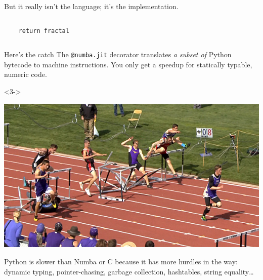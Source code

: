 \documentclass[aspectratio=169]{beamer}
\begin{document}
\begin{frame}[fragile]{But it really isn't the language; it's the implementation.}
\begin{columns}
\begin{onlyenv}
\begin{verbatim}
    return fractal
\end{verbatim}
\end{onlyenv}
\end{columns}

\large
\vspace{0.25 cm}
\begin{center}
\end{center}
\end{frame}

\begin{frame}{Here's the catch}
\large
\vspace{0.5 cm}
The \texttt{@numba.jit} decorator translates {\it a subset of} Python bytecode to machine instructions. You only get a speedup for statically typable, numeric code.

\begin{center}
\Large {}
\end{center}

\begin{uncoverenv}<3->
\begin{center}
\includegraphics[width=0.4\linewidth]{hurdle9.jpg}
\end{center}

Python is slower than Numba or C because it has more hurdles in the way: dynamic typing, pointer-chasing, garbage collection, hashtables, string equality\ldots
\end{uncoverenv}
\end{frame}
\end{document}
